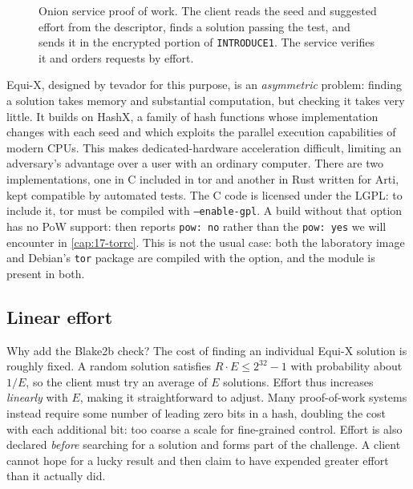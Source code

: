 \begin{figure}[htbp]
\centering

\caption{Onion service proof of work. The client reads the seed and suggested effort from the descriptor, finds a solution passing the test, and sends it in the encrypted portion of \texttt{INTRODUCE1}. The service verifies it and orders requests by effort.}
\label{fig:pow}
\end{figure}

\begin{approfondimento}
Equi-X, designed by tevador for this purpose, is an \emph{asymmetric} problem: finding a solution takes memory and substantial computation, but checking it takes very little. It builds on HashX, a family of hash functions whose implementation changes with each seed and which exploits the parallel execution capabilities of modern CPUs. This makes dedicated-hardware acceleration difficult, limiting an adversary's advantage over a user with an ordinary computer. There are two implementations, one in C included in tor and another in Rust written for Arti, kept compatible by automated tests. The C code is licensed under the LGPL: to include it, tor must be compiled with \texttt{--enable-gpl}. A build without that option has no PoW support:  then reports \texttt{pow: no} rather than the \texttt{pow: yes} we will encounter in \cref{cap:17-torrc}. This is not the usual case: both the laboratory image and Debian's \texttt{tor} package are compiled with the option, and the module is present in both.
\end{approfondimento}

\subsection{Linear effort}

Why add the Blake2b check? The cost of finding an individual Equi-X solution is roughly fixed. A random solution satisfies $R \cdot E \le 2^{32}-1$ with probability about $1/E$, so the client must try an average of $E$ solutions. Effort thus increases \emph{linearly} with $E$, making it straightforward to adjust. Many proof-of-work systems instead require some number of leading zero bits in a hash, doubling the cost with each additional bit: too coarse a scale for fine-grained control. Effort is also declared \emph{before} searching for a solution and forms part of the challenge. A client cannot hope for a lucky result and then claim to have expended greater effort than it actually did.

